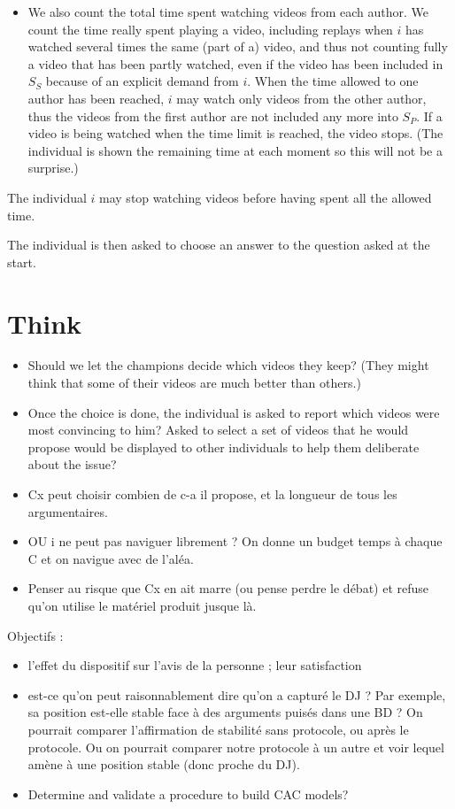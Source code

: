 \documentclass[version=3.21, pagesize, twoside=off, bibliography=totoc, DIV=calc, fontsize=12pt, a4paper]{scrartcl}
\begin{document}
\begin{itemize}
	\item We also count the total time spent watching videos from each author. We count the time really spent playing a video, including replays when $i$ has watched several times the same (part of a) video, and thus not counting fully a video that has been partly watched, even if the video has been included in $S_S$ because of an explicit demand from $i$. When the time allowed to one author has been reached, $i$ may watch only videos from the other author, thus the videos from the first author are not included any more into $S_P$. If a video is being watched when the time limit is reached, the video stops. (The individual is shown the remaining time at each moment so this will not be a surprise.)
\end{itemize}
The individual $i$ may stop watching videos before having spent all the allowed time.

The individual is then asked to choose an answer to the question asked at the start.

\section{Think}
\begin{itemize}
	\item Should we let the champions decide which videos they keep? (They might think that some of their videos are much better than others.)
	\item Once the choice is done, the individual is asked to report which videos were most convincing to him? Asked to select a set of videos that he would propose would be displayed to other individuals to help them deliberate about the issue?
	\item Cx peut choisir combien de c-a il propose, et la longueur de tous les argumentaires.
	\item OU i ne peut pas naviguer librement ? On donne un budget temps à chaque C et on navigue avec de l’aléa.
	\item Penser au risque que Cx en ait marre (ou pense perdre le débat) et refuse qu’on utilise le matériel produit jusque là.
\end{itemize}

Objectifs : 
\begin{itemize}
	\item l’effet du dispositif sur l’avis de la personne ; leur satisfaction
	\item est-ce qu’on peut raisonnablement dire qu’on a capturé le DJ ? Par exemple, sa position est-elle stable face à des arguments puisés dans une BD ? On pourrait comparer l’affirmation de stabilité sans protocole, ou après le protocole. Ou on pourrait comparer notre protocole à un autre et voir lequel amène à une position stable (donc proche du DJ).
	\item Determine and validate a procedure to build CAC models?
\end{itemize}
\end{document}
